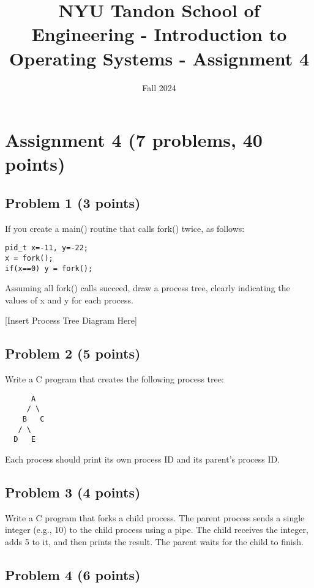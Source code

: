 \documentclass{article}
\title{NYU Tandon School of Engineering - Introduction to Operating Systems - Assignment 4}
\author{}
\date{Fall 2024}
\begin{document}
\maketitle

\section*{Assignment 4 (7 problems, 40 points)}

\subsection*{Problem 1 (3 points)}

If you create a main() routine that calls fork() twice, as follows:

\begin{verbatim}
pid_t x=-11, y=-22;
x = fork();
if(x==0) y = fork();
\end{verbatim}

Assuming all fork() calls succeed, draw a process tree, clearly indicating the values of x and y for each process.


[Insert Process Tree Diagram Here]


\subsection*{Problem 2 (5 points)}

Write a C program that creates the following process tree:

\begin{verbatim}
      A
     / \
    B   C
   / \
  D   E
\end{verbatim}
Each process should print its own process ID and its parent's process ID.


\subsection*{Problem 3 (4 points)}

Write a C program that forks a child process. The parent process sends a single integer (e.g., 10) to the child process using a pipe. The child receives the integer, adds 5 to it, and then prints the result. The parent waits for the child to finish.


\subsection*{Problem 4 (6 points)}
\end{document}
